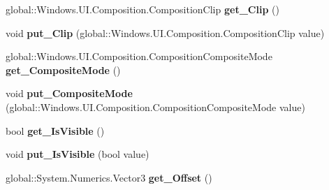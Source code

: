 \begin{DoxyCompactItemize}
\item 
\mbox{\label{interface_windows_1_1_u_i_1_1_composition_1_1_i_visual_ad0c2e9949756caf002a9224770412cd2}} 
global\+::\+Windows.\+U\+I.\+Composition.\+Composition\+Clip {\bfseries get\+\_\+\+Clip} ()
\item 
\mbox{\label{interface_windows_1_1_u_i_1_1_composition_1_1_i_visual_aa89c3bfb77967afd71d66e1adb50d78a}} 
void {\bfseries put\+\_\+\+Clip} (global\+::\+Windows.\+U\+I.\+Composition.\+Composition\+Clip value)
\item 
\mbox{\label{interface_windows_1_1_u_i_1_1_composition_1_1_i_visual_a8d4c301ec2cd6a02a533dd5077a01dcf}} 
global\+::\+Windows.\+U\+I.\+Composition.\+Composition\+Composite\+Mode {\bfseries get\+\_\+\+Composite\+Mode} ()
\item 
\mbox{\label{interface_windows_1_1_u_i_1_1_composition_1_1_i_visual_a23a31d796c4457b2e748aa0b505ad7c8}} 
void {\bfseries put\+\_\+\+Composite\+Mode} (global\+::\+Windows.\+U\+I.\+Composition.\+Composition\+Composite\+Mode value)
\item 
\mbox{\label{interface_windows_1_1_u_i_1_1_composition_1_1_i_visual_a40a0aa33cd325b0495e9d619fa205241}} 
bool {\bfseries get\+\_\+\+Is\+Visible} ()
\item 
\mbox{\label{interface_windows_1_1_u_i_1_1_composition_1_1_i_visual_a0050bae560148650b7020aec205c3506}} 
void {\bfseries put\+\_\+\+Is\+Visible} (bool value)
\item 
\mbox{\label{interface_windows_1_1_u_i_1_1_composition_1_1_i_visual_aa330691d0b439cb6f52bd0f8ee1acc4f}} 
global\+::\+System.\+Numerics.\+Vector3 {\bfseries get\+\_\+\+Offset} ()
\item 
\mbox{\label{interface_windows_1_1_u_i_1_1_composition_1_1_i_visual_ab591b5dd5dce0a9cdfa72e957ce3731e}} 

\end{DoxyCompactItemize}
